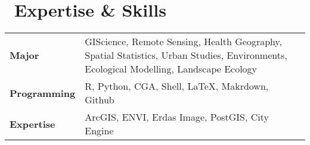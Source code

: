 \section{\texorpdfstring{\faLaptop\ Expertise \& Skills}{Expertise \& Skills}}
\begin{tabular}{p{} p{}}
\textbf{Major} & GIScience, Remote Sensing, Health Geography, Spatial Statistics, Urban Studies, Environments, Ecological Modelling, Landscape Ecology\\
\textbf{Programming} & R, Python, CGA, Shell, LaTeX, Makrdown, Github \\
\textbf{Expertise} & ArcGIS, ENVI, Erdas Image, PostGIS, City Engine \\
\end{tabular}
